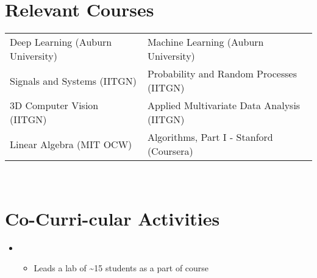 \documentclass[mm]{simple_style}
\begin{document}
\begin{resume}
\vspace{-1ex}
\section{Relevant Courses}
\begingroup %
    \renewcommand{\arraystretch}{1.1} %
    \begin{tabular}{@{\hskip -0.2pt}l @{\hskip 15ex}l }
        Deep Learning (Auburn University) & Machine Learning (Auburn University) \\
        Signals and Systems (IITGN) & Probability and Random Processes (IITGN) \\
        3D Computer Vision (IITGN) & Applied Multivariate Data Analysis (IITGN)\\
        Linear Algebra (MIT OCW) & Algorithms, Part I - Stanford (Coursera)\\
    \end{tabular}
\endgroup
\\[2.5ex]
\sectionline

\vspace{-1ex}
\section{Co-Curri-cular Activities}
\vspace{9pt}
\begin{itemize}[label={}, leftmargin=0pt, topsep=0pt]
    \item {} 
        \begin{itemize}[label={}, topsep=3pt]
            \item Leads a lab of \textasciitilde 15 students as a part of  course
        \iffalse
            \item Currently a GTA for \cusemph{Intro to MATLAB Programming} course conducted by Prof. Jacqueline Hundley
            \item Also lead a lab of \textasciitilde 15 students helping them understand the concepts of MATLAB programming
        \fi
        \end{itemize}
        

\end{itemize}
\end{resume}
\end{document}
